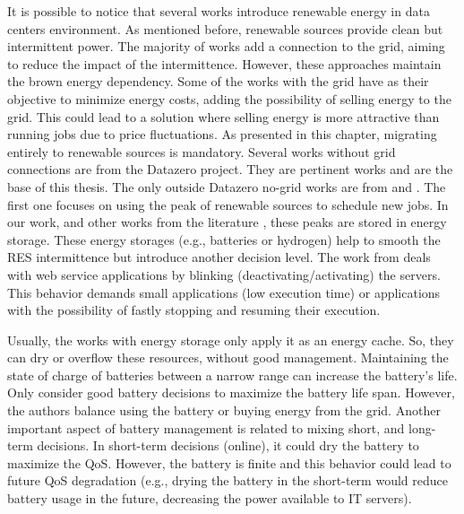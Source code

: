 It is possible to notice that several works introduce renewable energy in data centers environment. As mentioned before, renewable sources provide clean but intermittent power. The majority of works add a connection to the grid, aiming to reduce the impact of the intermittence. However, these approaches maintain the brown energy dependency. Some of the works with the grid have as their objective to minimize energy costs, adding the possibility of selling energy to the grid. This could lead to a solution where selling energy is more attractive than running jobs due to price fluctuations. As presented in this chapter, migrating entirely to renewable sources is mandatory. Several works without grid connections are from the Datazero project. They are pertinent works and are the base of this thesis. The only outside Datazero no-grid works are from \citeauthor{wiesner2022cucumber} and \citeauthor{sharma2011blink}. The first one focuses on using the peak of renewable sources to schedule new jobs. In our work, and other works from the literature \cite{li2016managing, li2017balancing, haddad2019mixed, haghshenas2020infrastructure, nayak2021efficient, peng2022energy, yuan2022optimal, venkataswamy2023rare}, these peaks are stored in energy storage. These energy storages (e.g., batteries or hydrogen) help to smooth the RES intermittence but introduce another decision level. The work from \citeauthor{sharma2011blink} deals with web service applications by blinking (deactivating/activating) the servers. This behavior demands small applications (low execution time) or applications with the possibility of fastly stopping and resuming their execution. 

Usually, the works with energy storage only apply it as an energy cache. So, they can dry or overflow these resources, without good management. Maintaining the state of charge of batteries between a narrow range can increase the battery's life. Only \citeauthor{li2016managing} consider good battery decisions to maximize the battery life span. However, the authors balance using the battery or buying energy from the grid. Another important aspect of battery management is related to mixing short, and long-term decisions. In short-term decisions (online), it could dry the battery to maximize the QoS. However, the battery is finite and this behavior could lead to future QoS degradation (e.g., drying the battery in the short-term would reduce battery usage in the future, decreasing the power available to IT servers).

